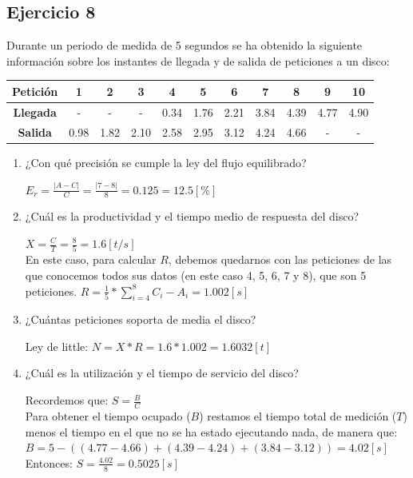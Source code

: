 \subsection{Ejercicio 8}
Durante un periodo de medida de 5 segundos se ha obtenido la siguiente información sobre los instantes de llegada y de salida de peticiones a un disco:
\begin{table}[H]\centering
\begin{tabular}{|c|c|c|c|c|c|c|c|c|c|c|}
\hline
\textbf{Petición} & 1    & 2    & 3    & 4    & 5    & 6    & 7    & 8    & 9    & 10   \\ \hline
\textbf{Llegada}  & -    & -    & -    & 0.34 & 1.76 & 2.21 & 3.84 & 4.39 & 4.77 & 4.90 \\ \hline
\textbf{Salida}   & 0.98 & 1.82 & 2.10 & 2.58 & 2.95 & 3.12 & 4.24 & 4.66 & -    & -    \\ \hline
\end{tabular}
\end{table}
\begin{enumerate}
    \item ¿Con qué precisión se cumple la ley del flujo equilibrado?
    \begin{tcolorbox}[colback=white,colframe=cyan!50!black,fonttitle=\bfseries]
    $E_r=\frac{|A-C|}{C}=\frac{|7-8|}{8}=0.125=12.5[\%]$
    \end{tcolorbox}
    \item ¿Cuál es la productividad y el tiempo medio de respuesta del disco?
    \begin{tcolorbox}[colback=white,colframe=cyan!50!black,fonttitle=\bfseries]
    $X=\frac{C}{T}=\frac{8}{5}=1.6[t/s]$\\
    En este caso, para calcular $R$, debemos quedarnos con las peticiones de las que conocemos todos sus datos (en este caso 4, 5, 6, 7 y 8), que son 5 peticiones.
    $R=\frac{1}{5}*\sum_{i=4}^{8}C_i-A_i = 1.002[s]$
    \end{tcolorbox}
    \item ¿Cuántas peticiones soporta de media el disco?
    \begin{tcolorbox}[colback=white,colframe=cyan!50!black,fonttitle=\bfseries]
    Ley de little: $N=X*R=1.6*1.002=1.6032 [t]$
    \end{tcolorbox}
    \item ¿Cuál es la utilización y el tiempo de servicio del disco?
    \begin{tcolorbox}[colback=white,colframe=cyan!50!black,fonttitle=\bfseries]
    Recordemos que: $S=\frac{B}{C}$\\
    Para obtener el tiempo ocupado ($B$) restamos el tiempo total de medición ($T$) menos el tiempo en el que no se ha estado ejecutando nada, de manera que:\\
    $B=5 - ((4.77-4.66) + (4.39-4.24) + (3.84-3.12)) = 4.02 [s]$\\
    Entonces: $S=\frac{4.02}{8} = 0.5025[s]$
    \end{tcolorbox}
\end{enumerate}

